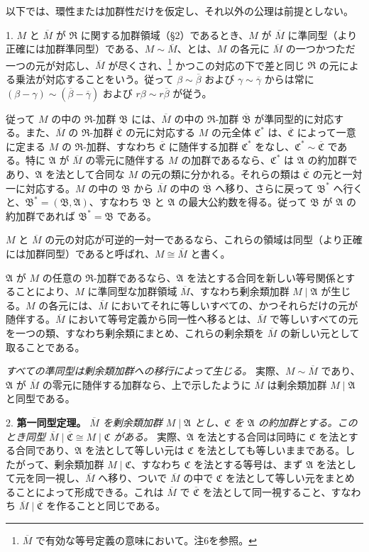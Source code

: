 \documentclass[11pt]{article}
\providecommand{\mR}{\mathfrak{R}}
\providecommand{\mA}{\mathfrak{A}}
\providecommand{\mB}{\mathfrak{B}}
\providecommand{\mC}{\mathfrak{C}}
\begin{document}
以下では、環性または加群性だけを仮定し、それ以外の公理は前提としない。

1. $M$ と $\overline M$ が $\mR$ に関する加群領域（§2）であるとき、$M$ が $\overline M$ に準同型（より正確には加群準同型）である、$M\sim\overline M$、とは、$M$ の各元に $\overline M$ の一つかつただ一つの元が対応し、$\overline M$ が尽くされ、\footnote{$\overline M$ で有効な等号定義の意味において。注6を参照。} かつこの対応の下で差と同じ $\mR$ の元による乗法が対応することをいう。従って $\beta\sim\overline\beta$ および $\gamma\sim\overline\gamma$ からは常に $(\beta-\gamma)\sim(\overline\beta-\overline\gamma)$ および $r\beta\sim r\overline\beta$ が従う。

従って $M$ の中の $\mR$-加群 $\mB$ には、$\overline M$ の中の $\mR$-加群 $\overline{\mB}$ が準同型的に対応する。また、$\overline M$ の $\mR$-加群 $\overline{\mC}$ の元に対応する $M$ の元全体 $\mC^*$ は、$\overline{\mC}$ によって一意に定まる $M$ の $\mR$-加群、すなわち $\overline{\mC}$ に随伴する加群 $\mC^*$ をなし、$\mC^*\sim\overline{\mC}$ である。特に $\mA$ が $\overline M$ の零元に随伴する $M$ の加群であるなら、$\mC^*$ は $\mA$ の約加群であり、$\mA$ を法として合同な $M$ の元の類に分かれる。それらの類は $\overline{\mC}$ の元と一対一に対応する。$M$ の中の $\mB$ から $\overline M$ の中の $\overline{\mB}$ へ移り、さらに戻って $\mB^*$ へ行くと、$\mB^*=(\mB,\mA)$、すなわち $\mB$ と $\mA$ の最大公約数を得る。従って $\mB$ が $\mA$ の約加群であれば $\mB^*=\mB$ である。

$M$ と $\overline M$ の元の対応が可逆的一対一であるなら、これらの領域は同型（より正確には加群同型）であると呼ばれ、$M\cong\overline M$ と書く。

$\mA$ が $M$ の任意の $\mR$-加群であるなら、$\mA$ を法とする合同を新しい等号関係とすることにより、$M$ に準同型な加群領域 $\overline M$、すなわち剰余類加群 $M\mid\mA$ が生じる。$M$ の各元には、$\overline M$ においてそれに等しいすべての、かつそれらだけの元が随伴する。$\overline M$ において等号定義から同一性へ移るとは、$\overline M$ で等しいすべての元を一つの類、すなわち剰余類にまとめ、これらの剰余類を $\overline M$ の新しい元として取ることである。

\emph{すべての準同型は剰余類加群への移行によって生じる。} 実際、$M\sim\overline M$ であり、$\mA$ が $\overline M$ の零元に随伴する加群なら、上で示したように $\overline M$ は剰余類加群 $M\mid\mA$ と同型である。

2. \textbf{第一同型定理。} \emph{$\overline M$ を剰余類加群 $M\mid\mA$ とし、$\mC$ を $\mA$ の約加群とする。このとき同型 $\overline M\mid\overline{\mC}\cong M\mid\mC$ がある。} 実際、$\mA$ を法とする合同は同時に $\mC$ を法とする合同であり、$\mA$ を法として等しい元は $\mC$ を法としても等しいままである。したがって、剰余類加群 $M\mid\mC$、すなわち $\mC$ を法とする等号は、まず $\mA$ を法として元を同一視し、$\overline M$ へ移り、ついで $\overline M$ の中で $\mC$ を法として等しい元をまとめることによって形成できる。これは $\overline M$ で $\overline{\mC}$ を法として同一視すること、すなわち $\overline M\mid\overline{\mC}$ を作ることと同じである。
\end{document}
